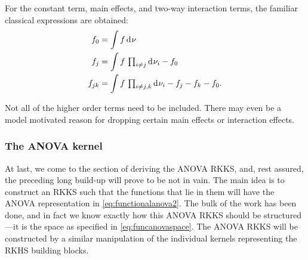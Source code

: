 
For the constant term, main effects, and two-way interaction terms, the familiar classical expressions are obtained:
\begin{align*}
  f_0 &= \int f \operatorname{d\!\:\!}\nu \\
  f_j &= \int f \, \textstyle\prod_{i\neq j} \operatorname{d\!\:\!}\nu_i  - f_0 \\
  f_{jk} &= \int f \, \textstyle\prod_{i\neq j,k} \operatorname{d\!\:\!}\nu_i  - f_j - f_k - f_0  .
\end{align*}



\begin{remark}
  Not all of the higher order terms need to be included. There may even be a model motivated reason for dropping certain main effects or interaction effects.  
\end{remark}


\subsubsection{The ANOVA kernel}

At last, we come to the section of deriving the ANOVA RKKS, and, rest assured, the preceding long build-up will prove to be not in vain.
The main idea is to construct an RKKS such that the functions that lie in them will have the ANOVA representation in \eqref{eq:functionalanova2}.
The bulk of the work has been done, and in fact we know exactly how this ANOVA RKKS should be structured---it is the space as specified in \eqref{eq:funcanovaspace}. 
The ANOVA RKKS will be constructed by a similar manipulation of the individual kernels representing the RKHS building blocks.

